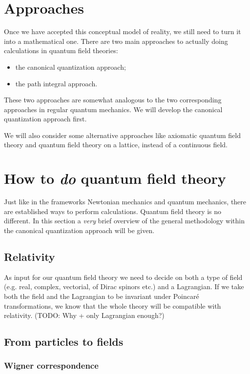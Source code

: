 \section{Approaches}
Once we have accepted this conceptual model of reality, we still need to turn it into a mathematical one. There are two main approaches to actually doing calculations in quantum field theories:
\begin{itemize}
\item the canonical quantization approach;
\item the path integral approach.
\end{itemize}
These two approaches are somewhat analogous to the two corresponding approaches in regular quantum mechanics. We will develop the canonical quantization approach first.

We will also consider some alternative approaches like axiomatic quantum field theory and quantum field theory on a lattice, instead of a continuous field.

\section{How to \textit{do} quantum field theory}
Just like in the frameworks Newtonian mechanics and quantum mechanics, there are established ways to perform calculations. Quantum field theory is no different. In this section a \textit{very} brief overview of the general methodology within the canonical quantization approach will be given.

\subsection{Relativity}
As input for our quantum field theory we need to decide on both a type of field (e.g. real, complex, vectorial, of Dirac spinors etc.) and a Lagrangian. If we take both the field and the Lagrangian to be invariant under Poincaré transformations, we know that the whole theory will be compatible with relativity. (TODO: Why + only Lagrangian enough?)

\subsection{From particles to fields}
\subsubsection{Wigner correspondence}

